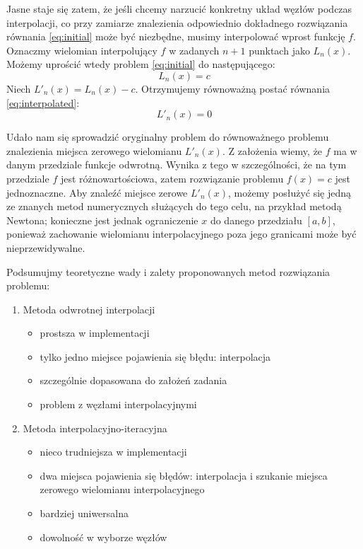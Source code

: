 \documentclass{article}
\begin{document}
Jasne staje się zatem, że jeśli chcemy narzucić konkretny układ węzłów podczas interpolacji, co przy zamiarze znalezienia odpowiednio dokładnego rozwiązania równania \eqref{eq:initial} może być niezbędne, musimy interpolować wprost funkcję $f$. Oznaczmy wielomian interpolujący $f$ w zadanych $n+1$ punktach jako $L_n(x)$. Możemy uprościć wtedy problem \eqref{eq:initial} do następującego:
\begin{equation}\label{eq:interpolated}
    L_n(x)=c
\end{equation}
Niech $L'_n(x)=L_n(x)-c$. Otrzymujemy równoważną postać równania \eqref{eq:interpolated}:
\begin{equation}\label{eq:root_eq}
    L'_n(x)=0
\end{equation}

Udało nam się sprowadzić oryginalny problem do równoważnego problemu znalezienia miejsca zerowego wielomianu $L'_n(x)$. Z założenia wiemy, że $f$ ma w danym przedziale funkcje odwrotną. Wynika z tego w szczególności, że na tym przedziale $f$ jest różnowartościowa, zatem rozwiązanie problemu $f(x)=c$ jest jednoznaczne. Aby znaleźć miejsce zerowe $L'_n(x)$, możemy posłużyć się jedną ze znanych metod numerycznych służących do tego celu, na przykład metodą Newtona; konieczne jest jednak ograniczenie $x$ do danego przedziału $[a,b]$, ponieważ zachowanie wielomianu interpolacyjnego poza jego granicami może być nieprzewidywalne.

Podsumujmy teoretyczne wady i zalety proponowanych metod rozwiązania problemu:
\begin{enumerate}
    \item Metoda odwrotnej interpolacji
    \begin{itemize}
        \item prostsza w implementacji
        \item tylko jedno miejsce pojawienia się błędu: interpolacja
        \item szczególnie dopasowana do założeń zadania
        \item problem z węzłami interpolacyjnymi
    \end{itemize}
    \item Metoda interpolacyjno-iteracyjna
    \begin{itemize}
        \item nieco trudniejsza w implementacji
        \item dwa miejsca pojawienia się błędów: interpolacja i szukanie miejsca zerowego wielomianu interpolacyjnego
        \item bardziej uniwersalna
        \item dowolność w wyborze węzłów
    \end{itemize}
\end{enumerate}
\end{document}
